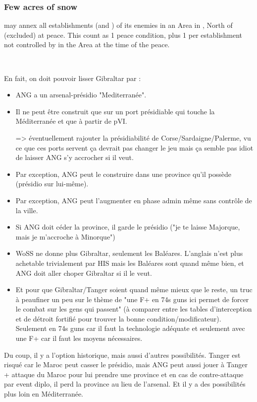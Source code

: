 \subsubsection{Few acres of snow}
\aparag \ANG may annex all establishments (\COL and \TP) of its enemies
in an Area in \continentAmerica, North of \granderegionChichimeca
(excluded) at peace.
\bparag This count as 1 peace condition, plus 1 per establishment not
controlled by \ANG in the Area at the time of the peace.

~\\

\begin{todo}
  En fait, on doit pouvoir lisser Gibraltar par :
  \begin{itemize}
  \item  ANG a un arsenal-présidio "Mediterranée".
  \item  Il ne peut être construit que sur un port présidiable qui
    touche la Méditerranée et que à partir de pVI.

    => éventuellement rajouter la présidiabilité de
    Corse/Sardaigne/Palerme, vu ce que ces ports servent ça devrait pas
    changer le jeu mais ça semble pas idiot de laisser ANG s'y accrocher
    si il veut.
  \item Par exception, ANG peut le construire dans une province qu'il
    possède (présidio sur lui-même).
  \item  Par exception, ANG peut l'augmenter en phase admin même sans
    contrôle de la ville.
  \item Si ANG doit céder la province, il garde le présidio ("je te
    laisse Majorque, mais je m'accroche à Minorque")
  \item WoSS ne donne plus Gibraltar, seulement les Baléares. L'anglais
    n'est plus achetable trivialement par HIS mais les Baléares sont
    quand même bien, et ANG doit aller choper Gibraltar si il le veut.
  \item Et pour que Gibraltar/Tanger soient quand même mieux que le
    reste, un truc à peaufiner un peu sur le thème de "une F+ en 74s
    guns ici permet de forcer le combat sur les gens qui passent" (à
    comparer entre les tables d'interception et de détroit fortifié pour
    trouver la bonne condition/modificateur). Seulement en 74s guns car
    il faut la technologie adéquate et seulement avec une F+ car il faut
    les moyens nécessaires.
  \end{itemize}
  
  Du coup, il y a l'option historique, mais aussi d'autres
  possibilités. Tanger est risqué car le Maroc peut casser le présidio,
  mais ANG peut aussi jouer à Tanger + attaque du Maroc pour lui prendre
  une province et en cas de contre-attaque par event diplo, il perd la
  province au lieu de l'arsenal. Et il y a des possibilités plus loin en
  Méditerranée.


\end{todo}
